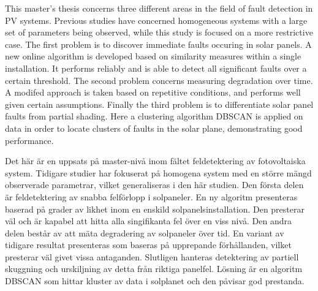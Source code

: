 \newenvironment{abstractpage}
  {\cleardoublepage\vspace*{\fill}\thispagestyle{empty}}
  {\vfill\cleardoublepage}
\newenvironment{polyAbstract}[1]
  {\bigskip\selectlanguage{#1}%
   \begin{center}\bfseries\abstractname\end{center}}
  {\par\bigskip}

\begin{abstractpage}
\begin{polyAbstract}{english}
This master's thesis concerns three different areas in the field of fault detection in PV systems.
Previous studies have concerned homogeneous systems with a large set of parameters being observed, while this study is focused on a more restrictive case.
The first problem is to discover immediate faults occuring in solar panels.
A new online algorithm is developed based on similarity measures within a single installation.
It performs reliably and is able to detect all significant faults over a certain threshold.
The second problem concerns measuring degradation over time.
A modifed approach is taken based on repetitive conditions, and performs well given certain assumptions.
Finally the third problem is to differentiate solar panel faults from partial shading.
Here a clustering algorithm DBSCAN is applied on data in order to locate clusters of faults in the solar plane, demonstrating good performance.

\end{polyAbstract}

\begin{polyAbstract}{swedish}
Det här är en uppsats på master-nivå inom fältet feldetektering av fotovoltaiska system.
Tidigare studier har fokuserat på homogena system med en större mängd observerade parametrar, vilket generaliseras i den här studien.
Den första delen är feldetektering av snabba felförlopp i solpaneler.
En ny algoritm presenteras baserad på grader av likhet inom en enskild solpanelsinstallation.
Den presterar väl och är kapabel att hitta alla singifikanta fel över en viss nivå.
Den andra delen består av att mäta degradering av solpaneler över tid.
En variant av tidigare resultat presenteras som baseras på upprepande förhållanden, vilket presterar väl givet vissa antaganden.
Slutligen hanteras detektering av partiell skuggning och urskiljning av detta från riktiga panelfel.
Lösning är en algoritm DBSCAN som hittar kluster av data i solplanet och den påvisar god prestanda.

\end{polyAbstract}
\end{abstractpage}

